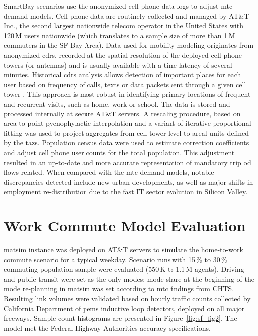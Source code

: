 SmartBay scenarios use the anonymized cell phone data logs to adjust \gls{mtc} demand models. Cell phone data are routinely collected and managed by AT\&T Inc., the second largest nationwide telecom operator in the United States with 120\,M users nationwide (which translates to a sample size of more than 1\,M commuters in the SF Bay Area). Data used for mobility modeling originates from anonymized \glspl{cdr}, recorded at the spatial resolution of the deployed cell phone towers (or antennas) and is usually available with a time latency of several minutes. Historical \glspl{cdr} analysis allows detection of important places for each user based on  frequency of calls, texts or data packets sent through a given cell tower \citep[][]{IsaacmanEtAl_LNCS_2011, BeckerEtAl_CACM_2013}. This approach is most robust in identifying primary locations of frequent and recurrent visits, such as home, work or school. The data is stored and processed internally at secure AT\&T servers. A rescaling procedure, based on area-to-point pycnophylactic interpolation \citep[][]{KaiserEtAl_PMC_2013} and a variant of iterative proportional fitting was used to project aggregates from cell tower level to areal units defined by the \glspl{taz}. Population census data were used to estimate correction coefficients and adjust cell phone user counts for the total population. This adjustment resulted in an up-to-date and more accurate representation of mandatory trip \gls{od} flows related. When compared with the \gls{mtc} demand models, notable discrepancies detected include new urban developments, as well as major shifts in employment re-distribution due to the fast IT sector evolution in Silicon Valley.

\section{Work Commute Model Evaluation}
\gls{matsim} instance was deployed on AT\&T servers to simulate the home-to-work commute scenario for a typical weekday. Scenario runs with 15\,\% to 30\,\% commuting population sample were evaluated (550\,K to 1.1\,M agents). Driving and public transit were set as the only modes; mode share at the beginning of the mode re-planning in \gls{matsim} was set according to \gls{mtc} findings from CHTS. Resulting link volumes were validated based on hourly traffic counts collected by California Department of \gls{pems} inductive loop detectors, deployed on all major freeways. Sample count histograms are presented in Figure~\ref{fig:sf_fig2}. The model met the Federal Highway Authorities accuracy specifications.

